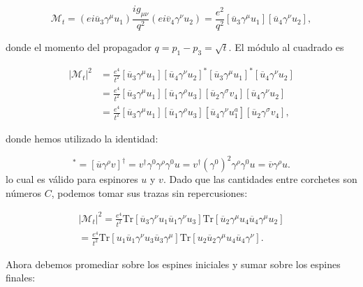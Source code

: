\begin{equation}
\mathcal{M}_t = (ei\overline{u}_3\gamma^\mu u_1) \frac{ig_{\mu\nu}}{q^2} (ei\overline{v}_4\gamma^\nu u_2) = \frac{e^2}{q^2} [\overline{u}_3\gamma^\mu u_1][\overline{u}_4\gamma^\nu u_2],
\end{equation}

donde el momento del propagador $ q = p_1 - p_3 = \sqrt{t} $. El módulo al cuadrado es

\begin{equation}
\begin{aligned}
|\mathcal{M}_t|^2 &= \frac{e^4}{t^2} [\overline{u}_3\gamma^\mu u_1][\overline{u}_4\gamma^\nu u_2]^* [\overline{u}_3\gamma^\mu u_1]^*[\overline{u}_4\gamma^\nu u_2] \\
&= \frac{e^4}{t^2} [\overline{u}_3\gamma^\mu u_1][\overline{u}_1 \gamma^\rho u_3] [\overline{u}_2 \gamma^\sigma v_4] [\overline{u}_4\gamma^\nu u_2] \\
&= \frac{e^4}{t^2} [\overline{u}_3\gamma^\mu u_1][\overline{u}_1 \gamma^\rho u_3] [\overline{u}_4\gamma^\nu u_1^a][\overline{u}_2 \gamma^\sigma v_4],
\end{aligned}
\end{equation}

donde hemos utilizado la identidad:

\begin{equation}
[\overline{u} \gamma^\rho v]^* = [\overline{u} \gamma^\rho v]^\dagger = v^\dagger \gamma^0 \gamma^\rho \gamma^0 u = v^\dagger (\gamma^0)^2 \gamma^\rho \gamma^0 u = \overline{v} \gamma^\rho u.
\end{equation}
lo cual es válido para espinores $ u $ y $ v $. Dado que las cantidades entre corchetes son números $ C $, podemos tomar sus trazas sin repercusiones:

\begin{equation}
  \begin{aligned}
    |\mathcal{M}_t|^2 = \frac{e^4}{t^2} \text{Tr}[\overline{u}_3\gamma^\nu u_1 \overline{u}_1 \gamma^\nu u_3] \text{Tr}[\overline{u}_2 \gamma^\mu u_4 \overline{u}_4 \gamma^\mu u_2] \\ = \frac{e^4}{t^2} \text{Tr}[u_1 \overline{u}_1 \gamma^\nu u_3 \overline{u}_3 \gamma^\mu] \text{Tr}[u_2 \overline{u}_2 \gamma^\mu u_4 \overline{u}_4 \gamma^\nu].
  \end{aligned}

\end{equation}

Ahora debemos promediar sobre los espines iniciales y sumar sobre los espines finales:

